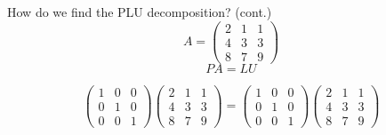 \documentclass{beamer}
\begin{document}
\begin{frame}{How do we find the PLU decomposition? (cont.)}
    \[A=
        \begin{pmatrix}{}
            2 & 1 & 1 \\
            4 & 3 & 3 \\
            8 & 7 & 9
        \end{pmatrix}
    \]
    \[
        PA=LU
    \]

    \[
        \begin{pmatrix}{}
            1 & 0 & 0 \\
            0 & 1 & 0 \\
            0 & 0 & 1
            \end{pmatrix}\begin{pmatrix}{}
            2 & 1 & 1 \\
            4 & 3 & 3 \\
            8 & 7 & 9
        \end{pmatrix}
        =\begin{pmatrix}{}
            1 & 0 & 0 \\
            0 & 1 & 0 \\
            0 & 0 & 1
        \end{pmatrix}
        \begin{pmatrix}{}
            2 & 1 & 1 \\
            4 & 3 & 3 \\
            8 & 7 & 9
        \end{pmatrix}
    \]


\end{frame}
\end{document}
